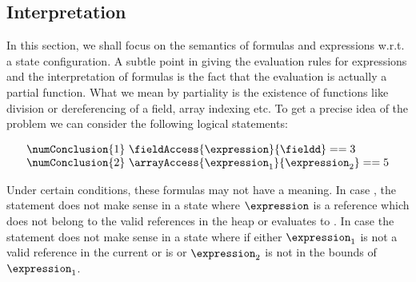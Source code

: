 
\newtheorem{interpretation}{Definition}[section]
\newtheorem{assertLangTh}{Lemma}[section]


\subsection{Interpretation}\label{interpret}
%
In this section, we shall focus on the semantics of formulas and expressions w.r.t. a state configuration.
A subtle point in giving the evaluation rules for expressions and the interpretation of formulas
is the fact that the evaluation is actually  a partial function. %
What we mean by partiality is the existence of functions like division or dereferencing of a field, array indexing etc. 
To get a precise idea of the problem we can consider the following logical statements: 

$$
\begin{array}{l} 
\numConclusion{1} \  \fieldAccess{\expression}{\fieldd} == 3\\
\numConclusion{2} \ \arrayAccess{\expression_1} {\expression_2} == 5
\end{array}
$$   

Under certain conditions, these formulas may not have a meaning. In case 
,  the statement does not make sense in a state where
$\expression$ is a reference which does not belong to the valid references in the heap 
or evaluates to  \Mynull. In case    the statement does not make sense in 
a state where if either $\expression_1 $ is not a valid reference in the current or is \Mynull{}  or $\expression_2$  is not in the bounds of $\expression_1 $.

